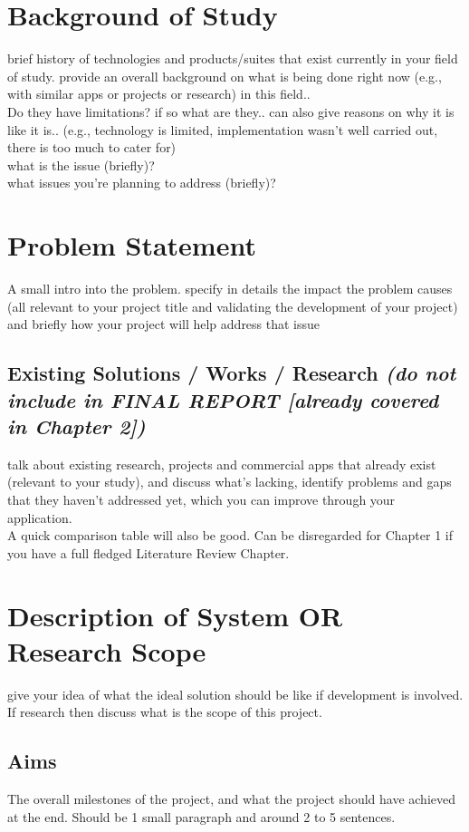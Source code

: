 \section{Background of Study}
brief history of technologies and products/suites that exist currently in your field of study. provide an overall background on what is being done right now (e.g., with similar apps or projects or research) in this field.. \\
Do they have limitations? if so what are they.. can also give reasons on why it is like it is.. (e.g., technology is limited, implementation wasn't well carried out, there is too much to cater for) \\
what is the issue (briefly)? \\
what issues you’re planning to address (briefly)?

\section{Problem Statement}
A small intro into the problem. specify in details the impact the problem causes (all relevant to your project title and validating the development of your project) and briefly how your project will help address that issue

\subsection{Existing Solutions / Works / Research \textit{(do not include in FINAL REPORT [already covered in Chapter 2])}}
talk about existing research, projects and commercial apps that already exist (relevant to your study), and discuss what’s lacking, identify problems and gaps that they haven't addressed yet, which you can improve through your application. \\
A quick comparison table will also be good.
Can be disregarded for Chapter 1 if you have a full fledged Literature Review Chapter.


\section{Description of System OR Research Scope}
give your idea of what the ideal solution should be like if development is involved. If research then discuss what is the scope of this project.

\subsection{Aims}
The overall milestones of the project, and what the project should have achieved at the end. Should be 1 small paragraph and around 2 to 5 sentences.

